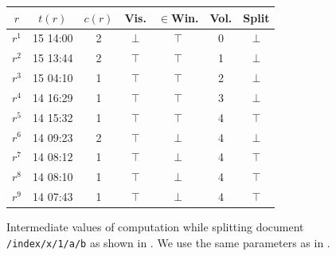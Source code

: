 \documentclass[abstracton,12pt]{scrartcl}
\theoremstyle{definition}
\begin{document}
\begin{figure}
    \begin{center}
        \begin{footnotesize}
            \begin{tabular}{|c|c|c|c|c|c|c|} 
                \hline
                $r$     & $t(r)$ &    $c(r)$ &        Vis. &      $\in$Win. &         Vol. &      Split \\
                \hline
                $r^1$ & 15 14:00 &  2 &             $\bot$ &         $\top$ &                 0 &                 $\bot$ \\ 
                \hline
                $r^2$ & 15 13:44 &  2 &             $\top$ &         $\top$ &                 1 &                 $\bot$ \\
                \hline
                $r^3$ & 15 04:10 &  1 &             $\top$ &         $\top$ &                 2 &                 $\bot$ \\
                \hline
                $r^4$ & 14 16:29 &  1 &             $\top$ &         $\top$ &                 3 &                 $\bot$ \\
                \hline
                $r^5$ & 14 15:32 &  1 &             $\top$ &         $\top$ &                 4 &                 $\top$ \\
                \hline
                $r^6$ & 14 09:23 &  2 &             $\top$ &         $\bot$ &                 4 &                 $\bot$ \\
                \hline
                $r^7$ & 14 08:12 &  1 &             $\top$ &         $\bot$ &                 4 &                 $\top$ \\
                \hline
                $r^8$ & 14 08:10 &  1 &             $\top$ &         $\bot$ &                 4 &                 $\top$ \\
                \hline
                $r^9$ & 14 07:43 &  1 &             $\top$ &         $\bot$ &                 4 &                 $\top$ \\
                \hline
            \end{tabular}
        \end{footnotesize}
    \end{center}
    \caption{
        Intermediate values of computation while splitting document \texttt{/index/x/1/a/b} as shown in .
        We use the same parameters as in .
    }
    \label{fig:split_doc_debug}
\end{figure}
\end{document}
